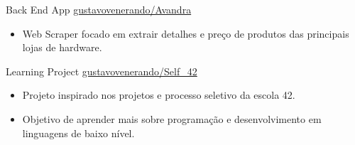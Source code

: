           {Back End App}{
         }{\href{https://github.com/gustavovenerando/Avandra}{gustavovenerando/Avandra}}
         \begin{itemize}
             \item Web Scraper focado em extrair detalhes e preço de produtos das principais lojas de hardware. 
         \end{itemize}

        \medskip
         		
         {Learning Project}{
        }{\href{https://github.com/gustavovenerando/Self_42}{gustavovenerando/Self\_42}}
        \begin{itemize}
             \item Projeto inspirado nos projetos e processo seletivo da escola 42.
             \item Objetivo de aprender mais sobre programação e desenvolvimento em linguagens de baixo nível.
        \end{itemize}